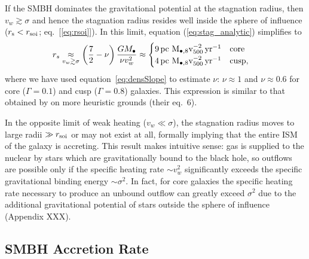 \documentclass[usenatbib,fleqn]{mn2e}
\newcommand{\rs}{r_s}
\newcommand{\pc}{\rm pc}
\newcommand{\Mbh}[1][]{M_{\bullet#1}}
\newcommand{\Mbheight}{M_{\bullet,8}}
\newcommand{\pyear}{{\rm yr}^{-1}}
\newcommand{\densSlope}{\nu}
\begin{document}
If the SMBH dominates the gravitational potential at the stagnation
radius, then $v_{w} \gtrsim \sigma$ and hence the stagnation radius
resides well inside the sphere of influence ($r_{\rm s} < r_{\rm
  soi}$; eq.~[\ref{eq:rsoi}]).  In this limit, equation
(\ref{eq:stag_analytic}) simplifies to
\begin{align}
  &\rs \underset{v_w \gtrsim \sigma}\approx \left(\frac{7}{2}-\densSlope\right)\frac{G \Mbh}{\densSlope v_w^2} \approx \begin{cases}
    9
 \, \pc \,\, \Mbheight v_{500}^{-2}\, \pyear& \text{core} \\
    4
 \, \pc \,\, \Mbheight v_{500}^{-2} \, \pyear  & \text{cusp}, 
  \end{cases}
  \label{eq:stag_simple}
\end{align}
where we have used equation~\eqref{eq:densSlope} to estimate
$\densSlope$: $\densSlope\approx 1$ and $\densSlope \approx 0.6$ for
core ($\Gamma = 0.1$) and cusp ($\Gamma = 0.8$) galaxies.  This
expression is similar to that obtained by \citet{Volonteri+11} on more
heuristic grounds (their eq.~6). 

In the opposite limit of weak heating ($v_{w} \ll \sigma$), the
stagnation radius moves to large radii $\gg r_{\rm soi}$ or may not
exist at all, formally implying that the entire ISM of the galaxy is
accreting.  This result makes intuitive sense: gas is supplied to the
nuclear by stars which are gravitationally bound to the black hole, so
outflows are possible only if the specific heating rate $\sim
v_{w}^{2}$ significantly exceeds the specific gravitational binding
energy $\sim \sigma^{2}$.  In fact, for core galaxies the specific heating rate necessary to produce an unbound outflow can greatly exceed $\sigma^{2}$ due to the additional gravitational potential of stars outside the sphere of influence (Appendix XXX).  


\subsection{SMBH Accretion Rate}
\end{document}
